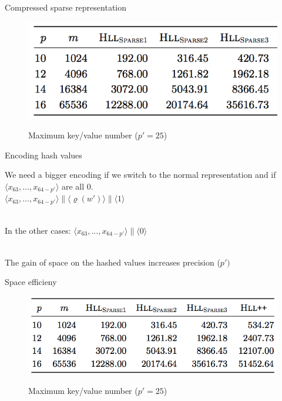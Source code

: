 \documentclass{beamer}
\begin{document}
\begin{frame}{Compressed sparse representation}


\begin{figure}[c]
\includegraphics [scale=0.45]  {sparse123.png}

Maximum key/value number ($p' = 25$)
\end{figure}

\end{frame}

\begin{frame}{Encoding hash values}

  We need a bigger encoding if we switch to the normal representation
  and if $\langle x_{63}, \dots, x_{64-p\prime} \rangle$ are all 0.
  ~\\
  \colorbox{light-gray}{$\langle x_{63}, \dots, x_{64-p\prime} \rangle \| \langle \varrho (w\prime) \rangle \| \langle 1 \rangle $}

  ~\\
  In the other cases:
  \colorbox{light-gray}{$\langle x_{63}, \dots, x_{64-p\prime} \rangle \| \langle 0 \rangle $}

  ~\\
  The gain of space on the hashed values increases precision ($p\prime)$

\end{frame}



\begin{frame}{Space efficieny}
  
\begin{figure}[c]
\includegraphics [scale=0.45]  {sparse_all.png}

Maximum key/value number ($p' = 25$)
\end{figure}
\end{frame}
\end{document}

